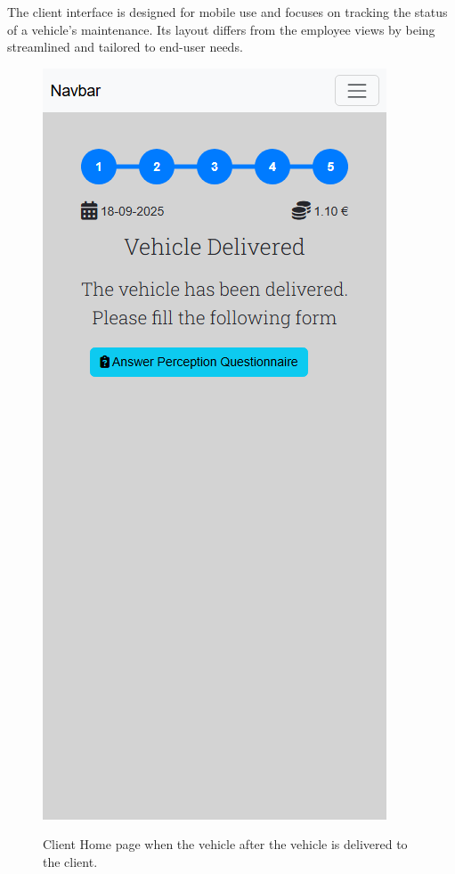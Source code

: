 \begin{figure}[h]
  \label{fig:MaintenanceState2}
\end{figure}


The client interface is designed for mobile use and focuses on tracking the status of a vehicle's maintenance. Its layout differs from the employee views by being streamlined and tailored to end-user needs.




\begin{figure}[h]
  \caption{Client Home page when the vehicle after the vehicle is delivered to the client.}
  \centering
  \includegraphics[width=\textwidth]{figs/Implementation/client/MaintenanceState5}
  \label{fig:MaintenanceState5}
\end{figure}
